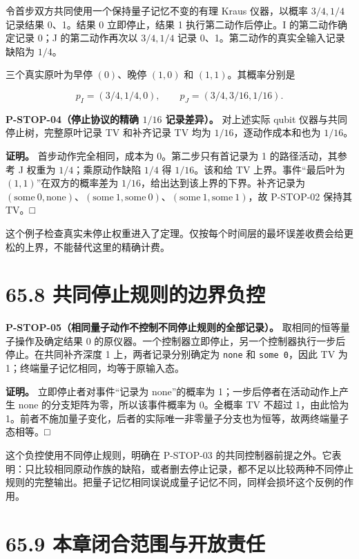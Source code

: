 \documentclass[
  11pt,
  oneside]{book}
\begin{document}
令首步双方共同使用一个保持量子记忆不变的有理 Kraus 仪器，以概率
\(3/4,1/4\) 记录结果 0、1。结果 0 立即停止，结果 1 执行第二动作后停止。I
的第二动作确定记录 0；J 的第二动作再次以 \(3/4,1/4\) 记录
0、1。第二动作的真实全输入记录缺陷为 \(1/4\)。

三个真实原叶为早停 \((0)\)、晚停 \((1,0)\) 和 \((1,1)\)。其概率分别是

\[
p_I=(3/4,1/4,0),\qquad p_J=(3/4,3/16,1/16).
\]

\protect\hypertarget{p-stop-04}{}{}

\textbf{P-STOP-04（停止协议的精确 \(1/16\) 记录差异）。} 对上述实际
qubit 仪器与共同停止树，完整原叶记录 TV 和补齐记录 TV 均为
\(1/16\)，逐动作成本和也为 \(1/16\)。

\textbf{证明。} 首步动作完全相同，成本为 0。第二步只有首记录为 1
的路径活动，其参考 J 权重为 \(1/4\)；乘原动作缺陷 \(1/4\) 得
\(1/16\)。该和给 TV 上界。事件``最后叶为 \((1,1)\)''在双方的概率差为
\(1/16\)，给出达到该上界的下界。补齐记录为
\((\mathrm{some}\ 0,\mathrm{none})\)、\((\mathrm{some}\ 1,\mathrm{some}\ 0)\)、\((\mathrm{some}\ 1,\mathrm{some}\ 1)\)，故
P-STOP-02 保持其 TV。□

这个例子检查真实未停止权重进入了定理。仅按每个时间层的最坏误差收费会给更松的上界，不能替代这里的精确计费。

\section{65.8 共同停止规则的边界负控}

\protect\hypertarget{p-stop-05}{}{}

\textbf{P-STOP-05（相同量子动作不控制不同停止规则的全部记录）。}
取相同的恒等量子操作及确定结果 0
的原仪器。一个控制器立即停止，另一个控制器执行一步后停止。在共同补齐深度
1 上，两者记录分别确定为 \texttt{none} 和 \texttt{some\ 0}，因此 TV 为
1；终端量子记忆相同，均等于原输入态。

\textbf{证明。} 立即停止者对事件``记录为 none''的概率为
1；一步后停者在活动动作上产生 none 的分支矩阵为零，所以该事件概率为
0。全概率 TV 不超过 1，由此恰为
1。前者不施加量子变化，后者的实际唯一非零量子分支也为恒等，故两终端量子态相等。□

这个负控使用不同停止规则，明确在 P-STOP-03
的共同控制器前提之外。它表明：只比较相同原动作族的缺陷，或者删去停止记录，都不足以比较两种不同停止规则的完整输出。把量子记忆相同误说成量子记忆不同，同样会损坏这个反例的作用。

\section{65.9 本章闭合范围与开放责任}
\end{document}
